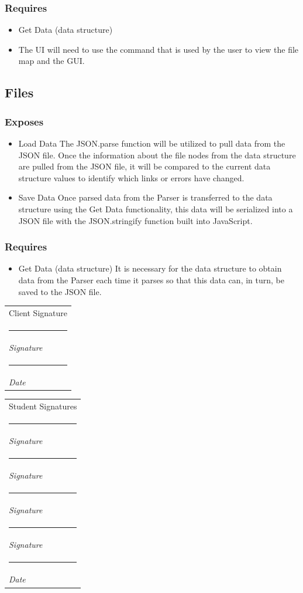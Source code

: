 \documentclass[letterpaper,10pt,titlepage,draftclsnofoot,onecolumn,onesided] {IEEEtran}
\makeatletter
\newcommand{\namesigdate}[2][4cm]{%
  \begin{tabular}{@{}p{#1}@{}}
    #2 \\[2\normalbaselineskip] \hrule \\[0pt]
    {\small \textit{Signature}} \\[2\normalbaselineskip] \hrule \\[0pt]
    {\small \textit{Date}}
  \end{tabular}
}
\newcommand{\studentnamesigdate}[2][4cm]{%
  \begin{tabular}{@{}p{#1}@{}}
    #2 \\[2\normalbaselineskip] \hrule \\[0pt]
    {\small \textit{Signature}} \\[2\normalbaselineskip] \hrule \\[0pt]
    {\small \textit{Signature}} \\[2\normalbaselineskip] \hrule \\[0pt]
    {\small \textit{Signature}} \\[2\normalbaselineskip] \hrule \\[0pt]
    {\small \textit{Signature}} \\[2\normalbaselineskip] \hrule \\[0pt]
    {\small \textit{Date}}
  \end{tabular}
}
\makeatother
\begin{document}
		\subsubsection{Requires}
		\begin{itemize}
			\item Get Data (data structure)
			\item The UI will need to use the command that is used by the user to view the file map and the GUI.
		\end{itemize}
		
	\subsection{Files}
		\subsubsection{Exposes}
		\begin{itemize}
			\item Load Data
			The JSON.parse function will be utilized to pull data from the JSON file. 
			Once the information about the file nodes from the data structure are pulled from the JSON file, it will be compared to the current data structure values to identify which links or errors have changed. \cite{stringify}
			\item Save Data
			Once parsed data from the Parser is transferred to the data structure using the Get Data functionality, this data will be serialized into a JSON file with the JSON.stringify function built into JavaScript.
		\end{itemize}
		\subsubsection{Requires}
		\begin{itemize}
			\item Get Data (data structure)
			It is necessary for the data structure to obtain data from the Parser each time it parses so that this data can, in turn, be saved to the JSON file.
		\end{itemize}





\pagebreak


\pagebreak

\namesigdate{Client Signature} \hfill 
\studentnamesigdate[4cm]{Student Signatures}
\end{document}
